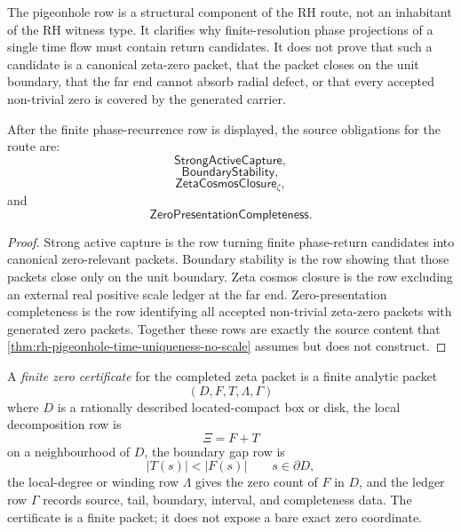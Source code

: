 \begin{principle}
\label{prin:rh-pigeonhole-recurrence-route-structure}
The pigeonhole row is a structural component of the RH route, not an
inhabitant of the RH witness type. It clarifies why finite-resolution
phase projections of a single time flow must contain return candidates.
It does not prove that such a candidate is a canonical zeta-zero packet,
that the packet closes on the unit boundary, that the far end cannot
absorb radial defect, or that every accepted non-trivial zero is covered
by the generated carrier.
\end{principle}

\begin{corollary}
\label{cor:rh-source-obligations-after-finite-phase-recurrence}
After the finite phase-recurrence row is displayed, the source obligations
for the route are:
$$
\mathsf{StrongActiveCapture},
$$
$$
\mathsf{BoundaryStability},
$$
$$
\mathsf{ZetaCosmosClosure}_{\zeta},
$$
and
$$
\mathsf{ZeroPresentationCompleteness}.
$$
\end{corollary}

\begin{proof}
Strong active capture is the row turning finite phase-return candidates
into canonical zero-relevant packets. Boundary stability is the row
showing that those packets close only on the unit boundary. Zeta cosmos
closure is the row excluding an external real positive scale ledger at
the far end. Zero-presentation completeness is the row identifying all
accepted non-trivial zeta-zero packets with generated zero packets.
Together these rows are exactly the source content that
\autoref{thm:rh-pigeonhole-time-uniqueness-no-scale} assumes but does not
construct.
\end{proof}

\begin{definition}
\label{def:rh-finite-zero-certificate}
A \emph{finite zero certificate} for the completed zeta packet is a
finite analytic packet
$$
(D,F,T,\Lambda,\Gamma)
$$
where $D$ is a rationally described located-compact box or disk, the
local decomposition row is
$$
\Xi=F+T
$$
on a neighbourhood of $D$, the boundary gap row is
$$
|T(s)|<|F(s)|
\qquad
s\in\partial D,
$$
the local-degree or winding row $\Lambda$ gives the zero count of $F$ in
$D$, and the ledger row $\Gamma$ records source, tail, boundary,
interval, and completeness data. The certificate is a finite packet; it
does not expose a bare exact zero coordinate.
\end{definition}

